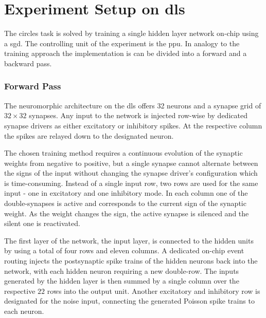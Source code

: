 \section{Experiment Setup on \gls{dls}}
\label{circlesimplementation}
The circles task is solved by training a single hidden layer network on-chip using a \acrlong{sgd}. The controlling unit of the experiment is the \gls{ppu}. In analogy to the training approach the implementation is can be divided into a forward and a backward pass. %

\subsubsection*{Forward Pass}

The neuromorphic architecture on the \gls{dls} offers 32 neurons and a synapse grid of $32 \times 32$ synapses. Any input to the network is injected row-wise by dedicated synapse drivers as either excitatory or inhibitory spikes. At the respective column the spikes are relayed down to the designated neuron. 

The chosen training method requires a continuous evolution of the synaptic weights from negative to positive, but a single synapse cannot alternate between the signs of the input without changing the synapse driver's configuration which is time-consuming. Instead of a single input row, two rows are used for the same input - one in excitatory and one inhibitory mode. In each column one of the double-synapses is active and corresponds to the current sign of the synaptic weight. As the weight changes the sign, the active synapse is silenced and the silent one is reactivated. 

The first layer of the network, the input layer, is connected to the hidden units by using a total of four rows and eleven columns. A dedicated on-chip event routing injects the postsynaptic spike trains of the hidden neurons back into the network, with each hidden neuron requiring a new double-row. The inputs generated by the hidden layer is then summed by a single column over the respective $22$ rows into the output unit. Another excitatory and inhibitory row is designated for the noise input, connecting the generated Poisson spike trains to each neuron.

